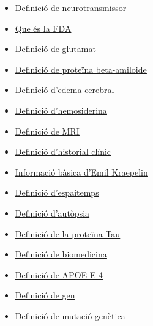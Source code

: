 \documentclass[a4paper,12pt]{report}
\begin{document}
\begin{itemize}
    \item \href{https://www.kenhub.com/es/library/anatomia-es/neurotransmisores}{\underline{Definició de neurotransmissor}}
    \item \href{https://www.ambit-bst.com/blog/qué-es-la-fda-y-cuáles-son-sus-funciones}{\underline{Que és la FDA}}
    \item \href{https://www.mentta.com/blog/que-es-el-glutamato/#:~:text=¿Qué%20es%20el%20glutamato%3F,partir%20de%20procesos%20de%20fermentación.}{\underline{Definició de glutamat}}
    \item \href{https://www.quimica.es/enciclopedia/Beta-amiloide.html}{\underline{Definició de proteïna beta-amiloide}}
    \item \href{https://bluenethospitals.com/health-library/edema-cerebral#:~:text=El%20Edema%20Cerebral%20se%20presenta,causando%20dolor%20en%20el%20paciente.}{\underline{Definició d'edema cerebral}}
    \item \href{http://www.neurocirugiacontemporanea.com/doku.php?id=hemosiderina}{\underline{Definició d'hemosiderina}}
    \item \href{https://www.nibib.nih.gov/science-education/science-topics/magnetic-resonance-imaging-mri}{\underline{Definició de MRI}}
    \item \href{https://www.igaleno.com/blog/que-es-historia-clinica/}{\underline{Definició d'historial clínic}}
    \item \href{https://www.ncbi.nlm.nih.gov/pmc/articles/PMC2927892/}{\underline{Informació bàsica d'Emil Kraepelin}}
    \item \href{https://ca.wikipedia.org/wiki/Espaitemps}{\underline{Definició d'espaitemps}}
    \item \href{https://peritojudicial.com/autopsia-necropsia/#Cu%E1l%20es%20la%20diferencia%20entre%20Autopsia%20y%20Necropsia%20%09}{\underline{Definició d'autòpsia}}
    \item \href{https://konexionalzheimer.com/la-proteina-tau-y-el-alzheimer/}{\underline{Definició de la proteïna Tau}}
    \item \href{https://www.aprendemas.com/co/blog/orientacion-academica/que-es-la-biomedicina-razones-para-dedicarse-profesionalmente-84318}{\underline{Definició de biomedicina}}
    \item \href{https://medlineplus.gov/genetics/gene/apoe/}{\underline{Definició de APOE E-4}}
    \item \href{https://www.genome.gov/es/genetics-glossary/Gen}{\underline{Definició de gen}}
    \item \href{https://kidshealth.org/es/parents/gene-mutations.html}{\underline{Definició de mutació genètica}}

\end{itemize}
\end{document}
